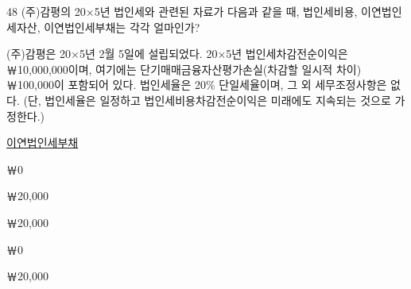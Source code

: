 \begin{question}{48}
(주)감평의 20×5년 법인세와 관련된 자료가 다음과 같을 때, 법인세비용, 이연법인세자산, 이연법인세부채는 각각 얼마인가?
\begin{framedtext}
(주)감평은 20×5년 2월 5일에 설립되었다. 20×5년 법인세차감전순이익은 ￦10,000,000이며, 여기에는 단기매매금융자산평가손실(차감할 일시적 차이) ￦100,000이 포함되어 있다. 법인세율은 20\% 단일세율이며, 그 외 세무조정사항은 없다. (단, 법인세율은 일정하고 법인세비용차감전순이익은 미래에도 지속되는 것으로 가정한다.)
\end{framedtext}

\noindent\hspace*{2em}\uline{이연법인세부채}\par
\begin{choices}
  \item {}￦0
  \item {}￦20,000
  \item {}￦20,000
  \item {}￦0
  \item {}￦20,000
\end{choices}
\end{question}
